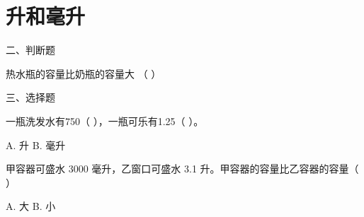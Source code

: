 
\chapter{升和毫升}

二、判断题

热水瓶的容量比奶瓶的容量大          （    ）

三、选择题

一瓶洗发水有750（   ），一瓶可乐有1.25（   ）。

A. 升           B. 毫升

甲容器可盛水 3000 毫升，乙窗口可盛水 3.1 升。甲容器的容量比乙容器的容量（   ）

A. 大           B. 小

